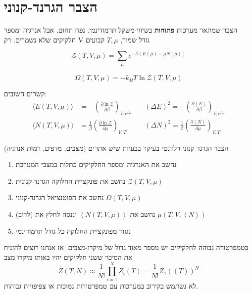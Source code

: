 \section{הצבר הגרנד-קנוני}
הצבר שמתאר מערכות \textbf{פתוחות} בשיווי-משקל תרמודינמי.
נפח תחום, אבל אנרגיה ומספר חלקיקים שלא נשמרים.
רק V גודל שמור, $T,\mu$ קבועים

\begin{cheatformula}
\[
\mathcal{Z} \left( T, V,\mu \right) = \sum_{\bar{\mu}} e^{-\beta \left( E(\bar{\mu}) - \mu N(\bar{\mu}) \right) } 
\]
\end{cheatformula}

\begin{cheatformula}
\[
\Omega \left( T,V,\mu \right) = -k_B T \ln \mathcal{Z} \left( T,V,\mu \right)
\]
\end{cheatformula}

קשרים חשובים:
    \begin{align*}
\langle E \left( T,V,\mu \right) \rangle &= - \left( \frac{\partial \ln \mathcal{Z}}{\partial \beta} \right)_{V,e^{\beta \mu }} &&\: \left( \Delta E \right) ^2 = - \left( \frac{\partial \left< E \right> }{\partial \beta}  \right)_{V,e^{\beta \mu }} \\[1em]
\langle N \left( T,V,\mu \right) \rangle &= \frac{1}{\beta} \left( \frac{\partial \ln \mathcal{Z}}{\partial \mu} \right)_{V,T } &&\: \left( \Delta N \right) ^2 = \frac{1}{\beta} \left( \frac{\partial \left< N \right> }{\partial \mu}  \right)_{V,T}
\end{align*}

\begin{cheatformula}
הצבר הגרנד-קנוני רלוונטי בעיקר בבעיות שיש אתרים (מצבים, מדפים, רמות אנרגיה)

\begin{enumerate}
    \item נחשב את האנרגיה ומספר החלקיקים כתלות במצבי המערכת
    \item נחשב את פונקציית החלוקה הגרנד-קנונית $\mathcal{Z}\left( T,V,\mu \right)$
    \item נחשב את הפוטנציאל הגרנד-קנוני $\Omega\left( T,V,\mu \right)$
    \item (לרוב) נחשב את $\left< N \left( T,V,\mu \right) \right>$ וננסה לחלץ את $\mu \left( T,V, \left <N \right> \right)$
    \item נגזור מפונקציית החלוקה כל גודל תרמודינמי
\end{enumerate}

\end{cheatformula}

\begin{cheatformula}
    בטמפרטורה גבוהה לחלקיקים יש מספר מאוד גדול של מיקרו-מצבים. אז אנחנו רוצים להזניח את הסיכוי ששני חלקיקים יהיו באותו מיקרו מצב
    $$Z\left(T,N\right) \approx \frac{1}{N!} \prod_{i=1}^{N}Z_i\left(T \right)= \frac{1}{N!} Z_1\left(\left(T \right)\right)^N$$
לא נשתמש בקירוב במערכות עם טמפרטורות נמוכות או צפיפויות גבוהות.
\end{cheatformula}
